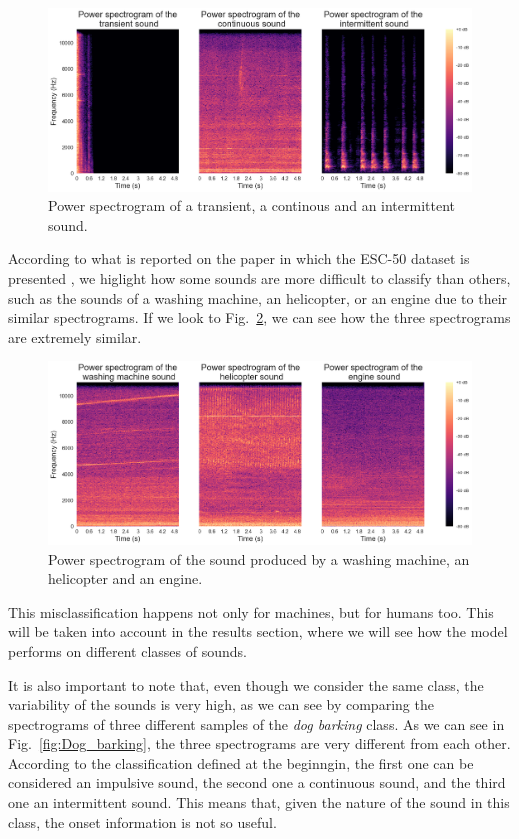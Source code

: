 \documentclass{article}
\begin{document}
\begin{sloppy}
\begin{figure}[ht]
  \centering
  \centerline{\includegraphics[width=\columnwidth]{Three_types_of_sound.png}}
  \caption{Power spectrogram of a transient, a continous and an intermittent sound.}
  \label{fig:power_spectrograms_3_sounds}
\end{figure}

According to what is reported on the paper in which the ESC-50 dataset is presented \cite{piczak2015dataset}, we higlight how some sounds are more difficult to classify than others,
such as the sounds of a washing machine, an helicopter, or an engine due to their similar spectrograms. If we look to Fig.~\ref{fig:Ambiguous_sounds}, we can see how the three spectrograms
are extremely similar.

\begin{figure}[ht]
  \centering
  \centerline{\includegraphics[width=\columnwidth]{Ambiguous_sounds.png}}
  \caption{Power spectrogram of the sound produced by a washing machine, an helicopter and an engine.}
  \label{fig:Ambiguous_sounds}
\end{figure}

This misclassification happens not only for machines, but for humans too. This will be taken into account in the results section, where we will see how the model performs on different classes of sounds.

It is also important to note that, even though we consider the same class, the variability of the sounds is very high, as we can see by comparing the spectrograms of three different
samples of the \textit{dog barking} class. As we can see in Fig.~\ref{fig:Dog_barking}, the three spectrograms are very different from each other. According to the classification defined at the beginngin,
the first one can be considered an impulsive sound, the second one a continuous sound, and the third one an intermittent sound. This means that, given the nature of the sound in this class,
the onset information is not so useful.


\end{sloppy}
\end{document}
